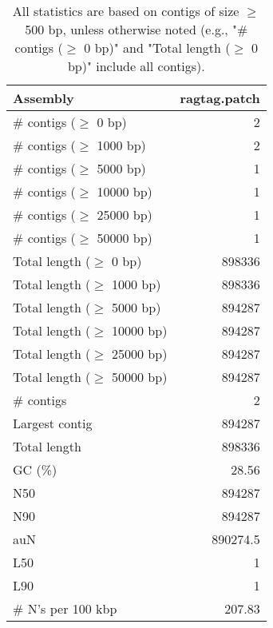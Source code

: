 \documentclass[12pt,a4paper]{article}
\begin{document}
\begin{table}[ht]
\begin{center}
\caption{All statistics are based on contigs of size $\geq$ 500 bp, unless otherwise noted (e.g., "\# contigs ($\geq$ 0 bp)" and "Total length ($\geq$ 0 bp)" include all contigs).}
\begin{tabular}{|l*{1}{|r}|}
\hline
Assembly & ragtag.patch \\ \hline
\# contigs ($\geq$ 0 bp) & 2 \\ \hline
\# contigs ($\geq$ 1000 bp) & 2 \\ \hline
\# contigs ($\geq$ 5000 bp) & 1 \\ \hline
\# contigs ($\geq$ 10000 bp) & 1 \\ \hline
\# contigs ($\geq$ 25000 bp) & 1 \\ \hline
\# contigs ($\geq$ 50000 bp) & 1 \\ \hline
Total length ($\geq$ 0 bp) & 898336 \\ \hline
Total length ($\geq$ 1000 bp) & 898336 \\ \hline
Total length ($\geq$ 5000 bp) & 894287 \\ \hline
Total length ($\geq$ 10000 bp) & 894287 \\ \hline
Total length ($\geq$ 25000 bp) & 894287 \\ \hline
Total length ($\geq$ 50000 bp) & 894287 \\ \hline
\# contigs & 2 \\ \hline
Largest contig & 894287 \\ \hline
Total length & 898336 \\ \hline
GC (\%) & 28.56 \\ \hline
N50 & 894287 \\ \hline
N90 & 894287 \\ \hline
auN & 890274.5 \\ \hline
L50 & 1 \\ \hline
L90 & 1 \\ \hline
\# N's per 100 kbp & 207.83 \\ \hline
\end{tabular}
\end{center}
\end{table}
\end{document}
